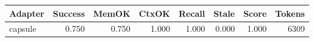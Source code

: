 \begin{tabular}{lrrrrrrr}
\hline
Adapter & Success & MemOK & CtxOK & Recall & Stale & Score & Tokens \\
\hline
capsule & 0.750 & 0.750 & 1.000 & 1.000 & 0.000 & 1.000 & 6309 \\
\hline
\end{tabular}
